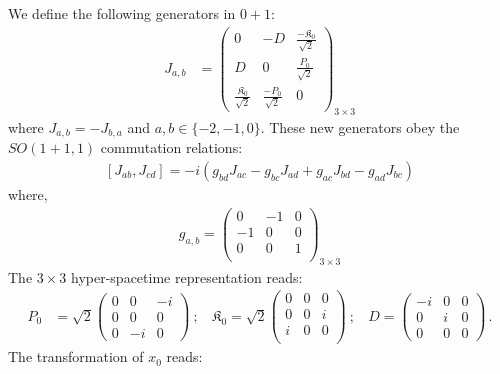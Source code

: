\documentclass[]{article}
\numberwithin{equation}{section}
\begin{document}
{{We define the following generators in $0+1$:
\begin{align}\label{Jab}
  J_{a,b}&=
  \begin{pmatrix}
  0&-D&\frac{-\mathfrak{K}_0}{\sqrt{2}}\\
  D&0&\frac{P_0}{\sqrt{2}}\\
    \frac{\mathfrak{K}_0}{\sqrt{2}}&\frac{-P_0}{\sqrt{2}}&0 
  \end{pmatrix}_{3\times3}
\end{align}
where $J_{a,b}=-J_{b,a}$ and $a,b\in\{-2,-1,0\}$. These new generators obey the $SO(1+1,1)$ commutation relations:
  \begin{align}\label{algebrasimp}
      \left[J_{{a}{b}},J_{{c}{d}}\right]=-i\left(g_{{b}{d}}J_{{a}{c}}-g_{{b}{c}}J_{{a}{d}}+g_{{a}{c}}J_{{b}{d}}-g_{{a}{d}}J_{{b}{c}}\right)
  \end{align}
where, 
  \begin{align}\label{metric}
      g_{a,b}=\begin{pmatrix}
  0&-1&0\\
  -1&0&0\\
  0&0&1\\
  \end{pmatrix}_{3\times3}
  \end{align}
The $3\times3$ hyper-spacetime representation reads:
\begin{align}
    P_{0}&=\sqrt{2}\begin{pmatrix}
        0&0&-i\\
        0&0&0\\
        0&-i&0
    \end{pmatrix}~;~~~~\mathfrak{K}_{0}=\sqrt{2}\begin{pmatrix}
        0&0&0\\
        0&0&i\\
        i&0&0\\
    \end{pmatrix}~;~~~~D=\begin{pmatrix}
        -i&0&0\\
        0&i&0\\
        0&0&0
    \end{pmatrix}\,.
\end{align}
The transformation of $x_{0}$ reads:
    \begin{table}
        \centering
        \label{tab:my_label}
    \end{table}
\pagebreak


}}
\end{document}
